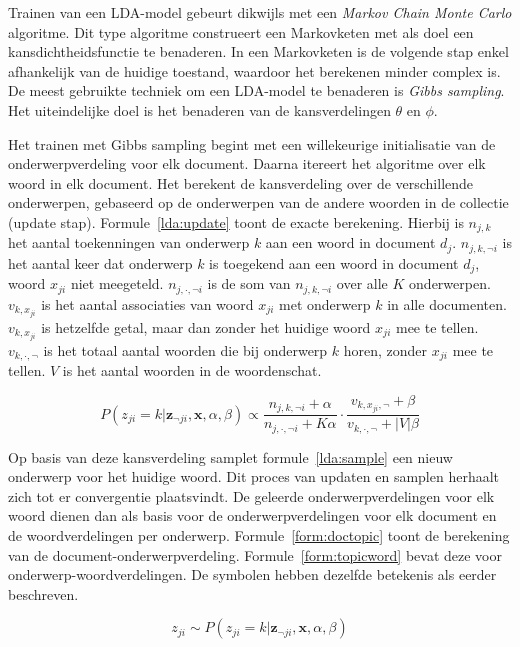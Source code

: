 Trainen van een LDA-model gebeurt dikwijls met een \emph{Markov Chain Monte Carlo} algoritme. Dit type algoritme construeert een Markovketen met als doel een kansdichtheidsfunctie te benaderen. In een Markovketen is de volgende stap enkel afhankelijk van de huidige toestand, waardoor het berekenen minder complex is. De meest gebruikte techniek om een LDA-model te benaderen is \emph{Gibbs sampling}. Het uiteindelijke doel is het benaderen van de kansverdelingen $\theta$ en $\phi$.

Het trainen met Gibbs sampling begint met een willekeurige initialisatie van de onderwerpverdeling voor elk document. Daarna itereert het algoritme over elk woord in elk document. Het berekent de kansverdeling over de verschillende onderwerpen, gebaseerd op de onderwerpen van de andere woorden in de collectie (update stap). Formule~\eqref{lda:update} toont de exacte berekening. Hierbij is $n_{j,k}$ het aantal toekenningen van onderwerp $k$ aan een woord in document $d_j$. $n_{j,k,\neg i}$ is het aantal keer dat onderwerp $k$ is toegekend aan een woord in document $d_j$, woord $x_{ji}$ niet meegeteld. $n_{j,\cdot,\neg i}$ is de som van $n_{j,k,\neg i}$ over alle $K$ onderwerpen. $v_{k,x_{ji}}$ is het aantal associaties van woord $x_{ji}$ met onderwerp $k$ in alle documenten. $v_{k,x_{ji}}$ is hetzelfde getal, maar dan zonder het huidige woord $x_{ji}$ mee te tellen. $v_{k,\cdot,\neg}$ is het totaal aantal woorden die bij onderwerp $k$ horen, zonder $x_{ji}$ mee te tellen. $V$ is het aantal woorden in de woordenschat.

\begin{equation}
    P(z_{ji} = k | \mathbf{z}_{\neg ji}, \mathbf{x}, \alpha, \beta) \propto \frac{n_{j,k,\neg i} + \alpha}{n_{j, \cdot, \neg i} + K \alpha} \cdot \frac{v_{k,x_{ji}, \neg}+ \beta}{v_{k,\cdot,\neg} + |V|\beta}
    \label{lda:update}
\end{equation}

Op basis van deze kansverdeling samplet formule~\eqref{lda:sample} een nieuw onderwerp voor het huidige woord. Dit proces van updaten en samplen herhaalt zich tot er convergentie plaatsvindt. De geleerde onderwerpverdelingen voor elk woord dienen dan als basis voor de onderwerpverdelingen voor elk document en de woordverdelingen per onderwerp. Formule~\eqref{form:doctopic} toont de berekening van de document-onderwerpverdeling. Formule~\eqref{form:topicword} bevat deze voor onderwerp-woordverdelingen. De symbolen hebben dezelfde betekenis als eerder beschreven.

\begin{equation}
    z_{ji} \sim  P(z_{ji} = k | \mathbf{z}_{\neg ji}, \mathbf{x}, \alpha, \beta)
    \label{lda:sample}
\end{equation}

